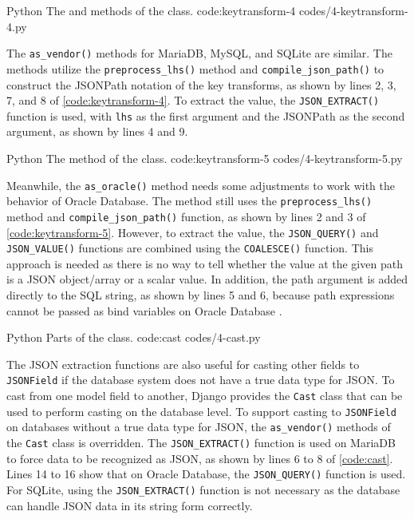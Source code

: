 \listing
{Python}
{The  and  methods of the  class.}
{code:keytransform-4}
{codes/4-keytransform-4.py}

The \verb|as_vendor()| methods for MariaDB, MySQL, and SQLite are similar. The
methods utilize the \verb|preprocess_lhs()| method and
\verb|compile_json_path()| to construct the JSONPath notation of the key
transforms, as shown by lines 2, 3, 7, and 8 of \autoref{code:keytransform-4}.
To extract the value, the \verb|JSON_EXTRACT()| function is used, with
\verb|lhs| as the first argument and the JSONPath as the second argument, as
shown by lines 4 and 9.

\listing
{Python}
{The  method of the  class.}
{code:keytransform-5}
{codes/4-keytransform-5.py}

Meanwhile, the \verb|as_oracle()| method needs some adjustments to work with
the behavior of Oracle Database. The method still uses the
\verb|preprocess_lhs()| method and \verb|compile_json_path()| function, as
shown by lines 2 and 3 of \autoref{code:keytransform-5}. However, to extract
the value, the \verb|JSON_QUERY()| and \verb|JSON_VALUE()| functions are
combined using the \verb|COALESCE()| function. This approach is needed as there
is no way to tell whether the value at the given path is a JSON object/array or
a scalar value. In addition, the path argument is added directly to the SQL
string, as shown by lines 5 and 6, because path expressions cannot be passed as
bind variables on Oracle Database \cite{oracle:jsonpath}.

\listing
{Python}
{Parts of the  class.}
{code:cast}
{codes/4-cast.py}

The JSON extraction functions are also useful for casting other fields to
\verb|JSONField| if the database system does not have a true data type for
JSON. To cast from one model field to another, Django provides the \verb|Cast|
class that can be used to perform casting on the database level. To support
casting to \verb|JSONField| on databases without a true data type for JSON, the
\verb|as_vendor()| methods of the \verb|Cast| class is overridden. The
\verb|JSON_EXTRACT()| function is used on MariaDB to force data to be
recognized as JSON, as shown by lines 6 to 8 of \autoref{code:cast}. Lines 14
to 16 show that on Oracle Database, the \verb|JSON_QUERY()| function is used.
For SQLite, using the \verb|JSON_EXTRACT()| function is not necessary as the
database can handle JSON data in its string form correctly.


